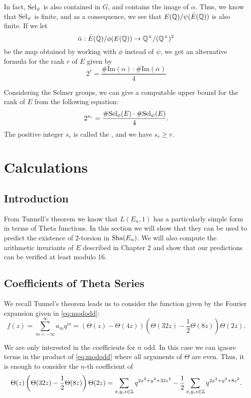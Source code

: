 \documentclass[12pt, a4paper]{report}
\begin{document}
In fact, $\text{\normalfont Sel}_\psi$ is also contained in $G$, and contains the image of $\alpha$. Thus,
we know that $\text{\normalfont Sel}_\psi$ is finite, and as a consequence, we see that
$E({\mathbb Q})/\psi(\bar{E}({\mathbb Q}))$ is also finite. If we let $$\bar{\alpha} :
\bar{E}({\mathbb Q}) / \phi (E({\mathbb Q})) \rightarrow {\mathbb Q}^\times / ({\mathbb Q}^\times)^2$$ be the map
obtained by working with $\phi$ instead of $\psi$, we get an alternative
formula for the rank $r$ of $E$ given by
\[2^r = \frac{\# \text{Im}(\alpha) \cdot \# \text{Im}(\bar{\alpha})}{4}\]

Considering the Selmer groups, we can give a computable upper bound for the rank
of $E$ from the following equation:
\[2^{s_r} = \frac{\# \text{\normalfont Sel}_\phi(E) \cdot \# \text{\normalfont Sel}_\psi(E)}{4}.\]
The positive integer $s_r$ is called the , and we have
$s_r \geq r.$


\newpage

\chapter{Calculations}

\section{Introduction}

From Tunnell's theorem we know that $L(E_n,1)$ has a particularly simple
form in terms of Theta functions. In this section we will show that they can be
used to predict the existence of 2-torsion in $\text{\normalfont Sha}(E_n)$. We will also compute
the arithmetic invariants of $E$ described in Chapter 2 and show that our
predictions can be verified at least modulo 16.


\section{Coefficients of Theta Series}
We recall Tunnel's theorem leads us to consider the function given by the
Fourier expansion given in \autoref{eq:mododd}:
\[
  f(z) = \sum\limits_{m=-\infty}^\infty a_m q^m
  = (\Theta(z) - \Theta(4z)) \left(\Theta(32z)-\frac{1}{2} \Theta(8z)\right) \Theta(2z).
\]


We are only interested in the coefficients for $n$ odd. In this case we can
ignore terms in the product of \autoref{eq:mododd} where all arguments of
$\Theta$ are even. Thus, it is enough to
consider the $n$-th coefficient of
\[
  \Theta(z) \left( \Theta(32z) - \frac{1}{2} \Theta(8z) \right)\Theta(2z) =
  \sum\limits_{x, y, z \in {\mathbb Z}} q^{2x^2+y^2+32z^2} - \frac{1}{2}
  \sum\limits_{x,y,z \in {\mathbb Z}} q^{2x^2+y^2+8z^2}.
\]
\end{document}
